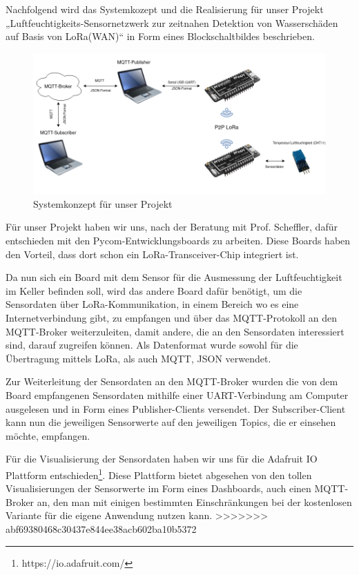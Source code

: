 Nachfolgend wird das Systemkozept und die Realisierung für unser Projekt „Luftfeuchtigkeits-Sensornetzwerk zur zeitnahen Detektion von Wasserschäden auf Basis von LoRa(WAN)“ in Form eines Blockschaltbildes beschrieben. 

\begin{figure}[h]
 \centering
 \includegraphics[width=1\textwidth]{pictures/Blockschaltbild_ProNeSy}
 \caption[Systemkonzept für unser Projekt]{Systemkonzept für unser Projekt}
 \label{fig:systemkonzept}
\end{figure}

Für unser Projekt haben wir uns, nach der Beratung mit Prof. Scheffler, dafür entschieden mit den Pycom-Entwicklungsboards zu arbeiten. Diese Boards haben den Vorteil, dass dort schon ein LoRa-Transceiver-Chip integriert ist. 

Da nun sich ein Board mit dem Sensor für die Ausmessung der Luftfeuchtigkeit im Keller befinden soll, wird das andere Board dafür benötigt, um die Sensordaten über LoRa-Kommunikation, in einem Bereich wo es eine Internetverbindung gibt, zu empfangen und über das MQTT-Protokoll an den MQTT-Broker weiterzuleiten, damit andere, die an den Sensordaten interessiert sind, darauf zugreifen können. Als Datenformat wurde sowohl für die Übertragung mittels LoRa, als auch MQTT, JSON verwendet.

Zur Weiterleitung der Sensordaten an den MQTT-Broker wurden die von dem Board empfangenen Sensordaten mithilfe einer UART-Verbindung am Computer ausgelesen und in Form eines Publisher-Clients versendet. Der Subscriber-Client kann nun die jeweiligen Sensorwerte auf den jeweiligen Topics, die er einsehen möchte, empfangen.

Für die Visualisierung der Sensordaten haben wir uns für die Adafruit IO Plattform entschieden\footnote{https://io.adafruit.com/}. Diese Plattform bietet abgesehen von den tollen Visualisierungen der Sensorwerte im Form eines Dashboards, auch einen MQTT-Broker an, den man mit einigen bestimmten Einschränkungen bei der kostenlosen Variante für die eigene Anwendung nutzen kann. 
>>>>>>> abf69380468c30437e844ee38acb602ba10b5372
